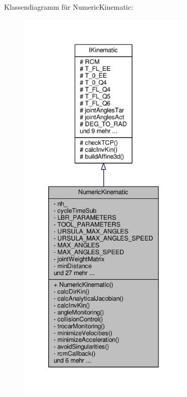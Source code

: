 Klassendiagramm für Numeric\-Kinematic\-:
\nopagebreak
\begin{figure}[H]
\begin{center}
\leavevmode
\includegraphics[height=550pt]{classNumericKinematic__inherit__graph}
\end{center}
\end{figure}


